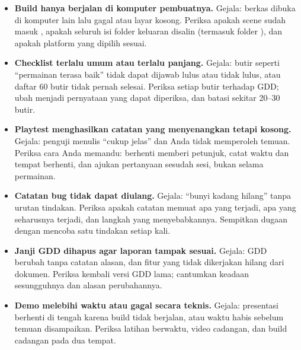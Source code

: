 
\begin{galatbox}
\begin{itemize}[leftmargin=1.4em, itemsep=0.35em]
  \item \textbf{Build hanya berjalan di komputer pembuatnya.}
        Gejala: berkas  dibuka di komputer lain lalu gagal atau
        layar kosong. Periksa apakah scene sudah masuk ,
        apakah seluruh isi folder keluaran disalin (termasuk folder
        ), dan apakah platform yang dipilih sesuai.
  \item \textbf{Checklist terlalu umum atau terlalu panjang.}
        Gejala: butir seperti ``permainan terasa baik'' tidak dapat dijawab
        lulus atau tidak lulus, atau daftar 60 butir tidak pernah selesai.
        Periksa setiap butir terhadap GDD; ubah menjadi pernyataan yang dapat
        diperiksa, dan batasi sekitar 20--30 butir.
  \item \textbf{Playtest menghasilkan catatan yang menyenangkan tetapi kosong.}
        Gejala: penguji menulis ``cukup jelas'' dan Anda tidak memperoleh
        temuan. Periksa cara Anda memandu: berhenti memberi petunjuk, catat
        waktu dan tempat berhenti, dan ajukan pertanyaan sesudah sesi, bukan
        selama permainan.
  \item \textbf{Catatan bug tidak dapat diulang.}
        Gejala: ``bunyi kadang hilang'' tanpa urutan tindakan. Periksa apakah
        catatan memuat apa yang terjadi, apa yang seharusnya terjadi, dan
        langkah yang menyebabkannya. Sempitkan dugaan dengan mencoba satu
        tindakan setiap kali.
  \item \textbf{Janji GDD dihapus agar laporan tampak sesuai.}
        Gejala: GDD berubah tanpa catatan alasan, dan fitur yang tidak
        dikerjakan hilang dari dokumen. Periksa kembali versi GDD lama;
        cantumkan keadaan sesungguhnya dan alasan perubahannya.
  \item \textbf{Demo melebihi waktu atau gagal secara teknis.}
        Gejala: presentasi berhenti di tengah karena build tidak berjalan, atau
        waktu habis sebelum temuan disampaikan. Periksa latihan berwaktu,
        video cadangan, dan build cadangan pada dua tempat.
\end{itemize}
\end{galatbox}


